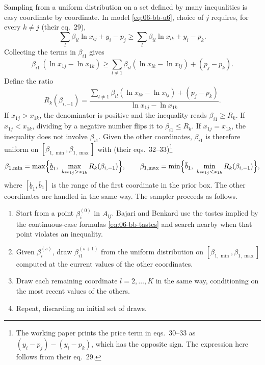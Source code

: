 Sampling from a uniform distribution on a set defined by many inequalities is easy coordinate by coordinate. In model
\eqref{eq:06-bb-u6}, choice of $j$ requires, for every $k \ne j$ (their eq.~29),
\begin{equation*}
  \sum_{l} \beta_{il}\ln x_{lj} + y_i - p_j \ge \sum_{l} \beta_{il}\ln x_{lk} + y_i - p_k .
\end{equation*}
Collecting the terms in $\beta_{i1}$ gives
\begin{equation*}
  \beta_{i1}\,(\ln x_{1j} - \ln x_{1k}) \ge \sum_{l \ne 1} \beta_{il}(\ln x_{lk} - \ln x_{lj}) + (p_j - p_k) .
\end{equation*}
Define the ratio
\begin{equation}\label{eq:06-bb-ratio}
  R_k(\beta_{i,-1}) = \frac{\sum_{l \ne 1} \beta_{il}(\ln x_{lk} - \ln x_{lj}) + (p_j - p_k)}{\ln x_{1j} - \ln x_{1k}} .
\end{equation}
If $x_{1j} > x_{1k}$, the denominator is positive and the inequality reads $\beta_{i1} \ge R_k$. If $x_{1j} < x_{1k}$,
dividing by a negative number flips it to $\beta_{i1} \le R_k$. If $x_{1j} = x_{1k}$, the inequality does not involve
$\beta_{i1}$. Given the other coordinates, $\beta_{i1}$ is therefore uniform on $[\beta_{1,\min}, \beta_{1,\max}]$ with
(their eqs.~32--33)\footnote{The working paper prints the price term in eqs.~30--33 as $(y_i - p_j) - (y_i - p_k)$, which
has the opposite sign. The expression here follows from their eq.~29.}
\begin{equation}\label{eq:06-bb-bounds}
  \beta_{1,\min} = \max\Bigl\{\underline b_1,\ \max_{k : x_{1j} > x_{1k}} R_k(\beta_{i,-1})\Bigr\}, \qquad
  \beta_{1,\max} = \min\Bigl\{\bar b_1,\ \min_{k : x_{1j} < x_{1k}} R_k(\beta_{i,-1})\Bigr\},
\end{equation}
where $[\underline b_1, \bar b_1]$ is the range of the first coordinate in the prior box. The other coordinates are
handled in the same way. The sampler proceeds as follows.
\begin{enumerate}
\item Start from a point $\beta_i^{(0)}$ in $A_{ij}$. Bajari and Benkard use the tastes implied by the continuous-case
formulas \eqref{eq:06-bb-tastes} and search nearby when that point violates an inequality.
\item Given $\beta_i^{(s)}$, draw $\beta_{i1}^{(s+1)}$ from the uniform distribution on $[\beta_{1,\min}, \beta_{1,\max}]$
computed at the current values of the other coordinates.
\item Draw each remaining coordinate $l = 2, \dots, K$ in the same way, conditioning on the most recent values of the others.
\item Repeat, discarding an initial set of draws.
\end{enumerate}
